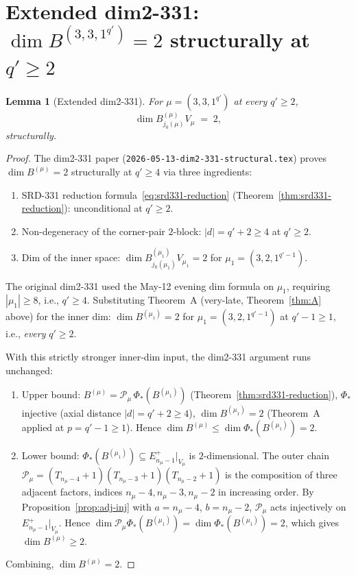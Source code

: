 \documentclass[11pt]{article}
\newtheorem{lemma}[theorem]{Lemma}
\theoremstyle{definition}
\begin{document}
\section{Extended dim2-331: $\dim B^{(3, 3, 1^{q'})} = 2$ structurally at $q' \ge 2$}\label{sec:ext-dim2-331}

\begin{lemma}[Extended dim2-331]\label{lem:dim2-331-extended}
For $\mu = (3, 3, 1^{q'})$ at every $q' \ge 2$,
\[
   \dim B^{(\mu)}_{j_0(\mu)} V_\mu \;=\; 2,
\]
\emph{structurally}.
\end{lemma}

\begin{proof}
The dim2-331 paper (\texttt{2026-05-13-dim2-331-structural.tex})
proves $\dim B^{(\mu)} = 2$ structurally at $q' \ge 4$ via three
ingredients:
\begin{enumerate}[label=(\roman*),leftmargin=2.2em,topsep=0.2em,itemsep=0.1em]
\item SRD-331 reduction formula~\eqref{eq:srd331-reduction}
  (Theorem~\ref{thm:srd331-reduction}): unconditional at $q' \ge 2$.
\item Non-degeneracy of the corner-pair $2$-block: $|d| = q' + 2 \ge 4$
  at $q' \ge 2$.
\item Dim of the inner space: $\dim B^{(\mu_1)}_{j_0(\mu_1)} V_{\mu_1}
  = 2$ for $\mu_1 = (3, 2, 1^{q'-1})$.
\end{enumerate}
The original dim2-331 used the May-12 evening dim formula on
$\mu_1$, requiring $|\mu_1| \ge 8$, i.e., $q' \ge 4$. Substituting
Theorem~A (very-late, Theorem~\ref{thm:A} above) for the inner dim:
$\dim B^{(\mu_1)} = 2$ for $\mu_1 = (3, 2, 1^{q'-1})$ at
$q' - 1 \ge 1$, i.e., \emph{every} $q' \ge 2$.

With this strictly stronger inner-dim input, the dim2-331 argument
runs unchanged:
\begin{enumerate}[leftmargin=2em,topsep=0.2em,itemsep=0.2em]
\item Upper bound:
$B^{(\mu)} = \mathcal{P}_\mu\,\Phi_*(B^{(\mu_1)})$ (Theorem~\ref{thm:srd331-reduction}),
$\Phi_*$ injective (axial distance $|d| = q' + 2 \ge 4$),
$\dim B^{(\mu_1)} = 2$ (Theorem~A applied at $p = q' - 1 \ge 1$).
Hence
$\dim B^{(\mu)} \le \dim \Phi_*(B^{(\mu_1)}) = 2$.

\item Lower bound: $\Phi_*(B^{(\mu_1)}) \subseteq E_{n_\mu - 1}^+|_{V_\mu}$
is $2$-dimensional. The outer chain
$\mathcal{P}_\mu = (T_{n_\mu-4}{+}1)(T_{n_\mu-3}{+}1)(T_{n_\mu-2}{+}1)$
is the composition of three adjacent factors, indices
$n_\mu - 4, n_\mu - 3, n_\mu - 2$ in increasing order. By
Proposition~\ref{prop:adj-inj} with $a = n_\mu - 4$, $b = n_\mu - 2$,
$\mathcal{P}_\mu$ acts injectively on $E_{n_\mu - 1}^+|_{V_\mu}$.
Hence
$\dim \mathcal{P}_\mu \Phi_*(B^{(\mu_1)}) = \dim \Phi_*(B^{(\mu_1)}) = 2$,
which gives $\dim B^{(\mu)} \ge 2$.
\end{enumerate}
Combining, $\dim B^{(\mu)} = 2$.
\end{proof}
\end{document}
